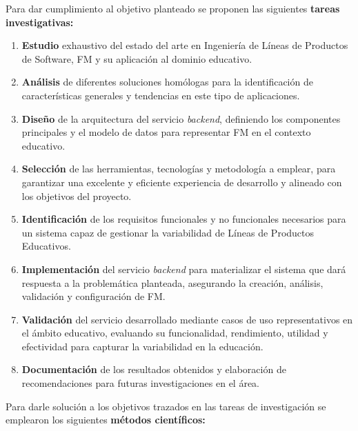 {    Para dar cumplimiento al objetivo planteado se proponen las siguientes \textbf{tareas investigativas:}
    \begin{enumerate}
        \item \textbf{Estudio} exhaustivo del estado del arte en Ingeniería de
        Líneas de Productos de Software, \ac{FM} y su
        aplicación al dominio educativo.
        \item \textbf{Análisis} de diferentes soluciones homólogas para la identificación de características
        generales y tendencias en este tipo de aplicaciones.
        \item \textbf{Diseño} de la arquitectura del servicio \textit{backend}, definiendo los
        componentes principales  y el modelo de datos para
        representar \ac{FM} en el contexto educativo.
        \item \textbf{Selección} de las herramientas, tecnologías y metodología a emplear, para garantizar
        una excelente y eficiente experiencia de desarrollo y alineado con los objetivos del proyecto.
        \item \textbf{Identificación} de los requisitos funcionales y no funcionales necesarios para un
        sistema capaz de gestionar la variabilidad de Líneas de Productos Educativos.
        \item \textbf{Implementación} del servicio \textit{backend} para materializar el sistema que dará respuesta
        a la problemática planteada, asegurando la creación, análisis, validación y configuración de \ac{FM}.
        \item \textbf{Validación} del servicio desarrollado mediante casos de uso representativos
        en el ámbito educativo, evaluando su funcionalidad, rendimiento, utilidad y 
        efectividad para capturar la variabilidad en la educación.
        \item \textbf{Documentación} de los resultados obtenidos y elaboración de recomendaciones para
        futuras investigaciones en el área.
    \end{enumerate}

    Para darle solución a los objetivos trazados en las tareas de investigación se emplearon los
    siguientes \textbf{métodos científicos:}

}
